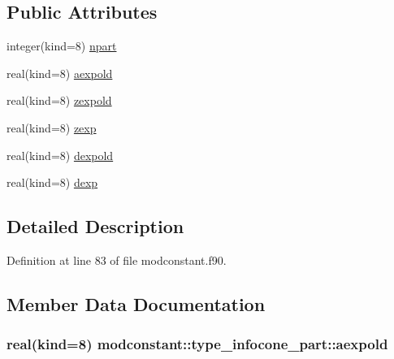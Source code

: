 \subsection*{Public Attributes}
\begin{DoxyCompactItemize}
\item 
integer(kind=8) \hyperlink{structmodconstant_1_1type__infocone__part_a7316d0f4db343f9dc87c45f241642f4f}{npart}
\item 
real(kind=8) \hyperlink{structmodconstant_1_1type__infocone__part_a8a178eeb6847ac2b7456b5ff8b3edd24}{aexpold}
\item 
real(kind=8) \hyperlink{structmodconstant_1_1type__infocone__part_a6bc976cbbe5cd3d696c2c9d0b5095c70}{zexpold}
\item 
real(kind=8) \hyperlink{structmodconstant_1_1type__infocone__part_adef877fd872e2e87bfbb3973af57aae1}{zexp}
\item 
real(kind=8) \hyperlink{structmodconstant_1_1type__infocone__part_af5a8f128638e0474edb01932dfd4dec7}{dexpold}
\item 
real(kind=8) \hyperlink{structmodconstant_1_1type__infocone__part_a0395444224fda81aaed35febb5cc9d82}{dexp}
\end{DoxyCompactItemize}


\subsection{Detailed Description}


Definition at line 83 of file modconstant.\+f90.



\subsection{Member Data Documentation}
\subsubsection[{\texorpdfstring{aexpold}{aexpold}}]{\setlength{\rightskip}{0pt plus 5cm}real(kind=8) modconstant\+::type\+\_\+infocone\+\_\+part\+::aexpold}\hypertarget{structmodconstant_1_1type__infocone__part_a8a178eeb6847ac2b7456b5ff8b3edd24}{}\label{structmodconstant_1_1type__infocone__part_a8a178eeb6847ac2b7456b5ff8b3edd24}


